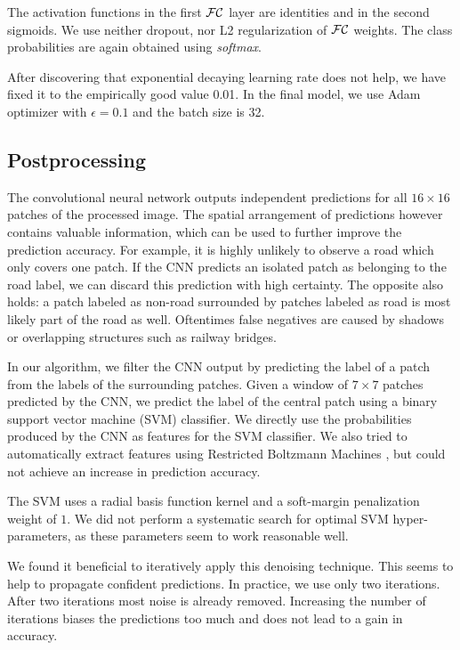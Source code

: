\documentclass[10pt,conference,compsocconf]{IEEEtran}
\begin{document}
The activation functions in the first $ \cal{FC} $ layer are identities and in the second sigmoids. We use neither dropout, nor L2 regularization of $ \cal{FC} $ weights. The class probabilities are again obtained using \textit{softmax}.

After discovering that exponential decaying learning rate does not help, we have fixed it to the empirically good value 0.01. 
In the final model, we use Adam optimizer with $ \epsilon = 0.1 $ and the batch size is 32.


\subsection{Postprocessing}
The convolutional neural network outputs independent predictions for all $ 16 \times 16 $ patches of the processed image. The spatial arrangement of predictions however contains valuable information, which can be used to further improve the prediction accuracy. For example, it is highly unlikely to observe a road which only covers one patch. If the CNN predicts an isolated patch as belonging to the road label, we can discard this prediction with high certainty. The opposite also holds: a patch labeled as non-road surrounded by patches labeled as road is most likely part of the road as well. Oftentimes false negatives are caused by shadows or overlapping structures such as railway bridges.

\par 
In our algorithm, we filter the CNN output by predicting the label of a patch from the labels of the surrounding patches. Given a window of $ 7 \times 7 $ patches predicted by the CNN, we predict the label of the central patch using a binary support vector machine (SVM) classifier. We directly use the probabilities produced by the CNN as features for the SVM classifier. We also tried to automatically extract features using Restricted Boltzmann Machines \cite{smolensky.1986}, but could not achieve an increase in prediction accuracy.
\par
The SVM uses a radial basis function kernel and a soft-margin penalization weight of $ 1 $. We did not perform a systematic search for optimal SVM hyper-parameters, as these parameters seem to work reasonable well.
\par 
We found it beneficial to iteratively apply this denoising technique. This seems to help to propagate confident predictions. In practice, we use only two iterations. After two iterations most noise is already removed. Increasing the number of iterations biases the predictions too much and does not lead to a gain in accuracy.
\end{document}
